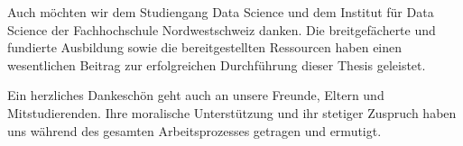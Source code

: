 Auch möchten wir dem Studiengang Data Science und dem Institut für Data Science der Fachhochschule Nordwestschweiz danken. Die breitgefächerte und fundierte Ausbildung sowie die bereitgestellten Ressourcen haben einen wesentlichen Beitrag zur erfolgreichen Durchführung dieser Thesis geleistet.

Ein herzliches Dankeschön geht auch an unsere Freunde, Eltern und Mitstudierenden. Ihre moralische Unterstützung und ihr stetiger Zuspruch haben uns während des gesamten Arbeitsprozesses getragen und ermutigt.




